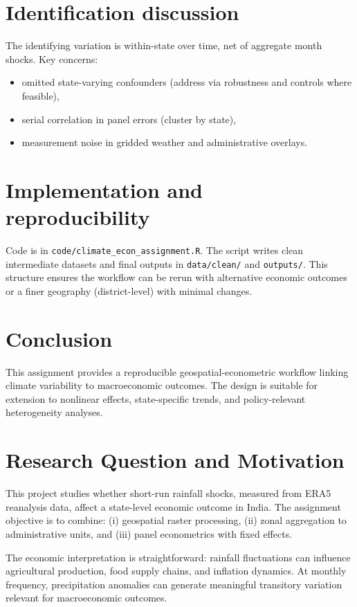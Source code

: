 \documentclass[11pt]{article}
\begin{document}
\section{Identification discussion}
The identifying variation is within-state over time, net of aggregate month shocks. Key concerns:
\begin{itemize}
  \item omitted state-varying confounders (address via robustness and controls where feasible),
  \item serial correlation in panel errors (cluster by state),
  \item measurement noise in gridded weather and administrative overlays.
\end{itemize}

\section{Implementation and reproducibility}
Code is in \texttt{code/climate\_econ\_assignment.R}. The script writes clean intermediate datasets
and final outputs in \texttt{data/clean/} and \texttt{outputs/}. This structure ensures the workflow can
be rerun with alternative economic outcomes or a finer geography (district-level) with minimal changes.

\section{Conclusion}
This assignment provides a reproducible geospatial-econometric workflow linking climate variability to
macroeconomic outcomes. The design is suitable for extension to nonlinear effects, state-specific trends,
and policy-relevant heterogeneity analyses.
\section{Research Question and Motivation}
This project studies whether short-run rainfall shocks, measured from ERA5 reanalysis data,
affect a state-level economic outcome in India. The assignment objective is to combine:
(i) geospatial raster processing, (ii) zonal aggregation to administrative units, and
(iii) panel econometrics with fixed effects.

The economic interpretation is straightforward: rainfall fluctuations can influence agricultural
production, food supply chains, and inflation dynamics. At monthly frequency, precipitation
anomalies can generate meaningful transitory variation relevant for macroeconomic outcomes.
\end{document}
